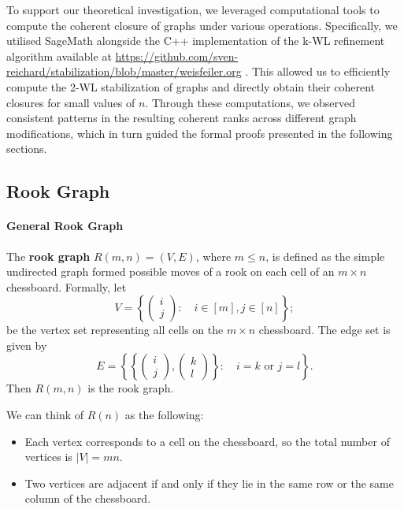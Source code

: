 To support our theoretical investigation, we leveraged computational tools to compute the coherent closure of graphs under various operations. Specifically, we utilised SageMath alongside the C++ implementation of the k-WL refinement algorithm available at \url{https://github.com/sven-reichard/stabilization/blob/master/weisfeiler.org} \cite{reichard_weisfeiler}. This allowed us to efficiently compute the 2-WL stabilization of graphs and directly obtain their coherent closures for small values of $n$. Through these computations, we observed consistent patterns in the resulting coherent ranks across different graph modifications, which in turn guided the formal proofs presented in the following sections.


\subsection{Rook Graph}

\paragraph{General Rook Graph}
The \textbf{rook graph} \( R(m,n) = (V, E) \), where \( m \leq n \), is defined as the simple undirected graph formed possible moves of a rook on each cell of an \( m \times n \) chessboard. Formally, let 
\begin{equation*}
    V = \left\{\begin{pmatrix}
        i \\ j
    \end{pmatrix} :\quad i\in [m],j\in [n]\right\};
\end{equation*}
be the vertex set representing all cells on the $m\times n$ chessboard. The edge set is given by
\begin{equation*}
    E = \left\{
        \left\{
        \begin{pmatrix}i\\j\end{pmatrix}, \begin{pmatrix}k\\l\end{pmatrix}
        \right\}
        :\quad i=k \text{ or } j=l
    \right\}.
\end{equation*}
Then $R(m,n)$ is the rook graph.
\newpage

We can think of $R(n)$ as the following:
\begin{itemize}
    \item Each vertex corresponds to a cell on the chessboard, so the total number of vertices is \( |V| = mn \).
    \item Two vertices are adjacent if and only if they lie in the same row or the same column of the chessboard. 
\end{itemize}

